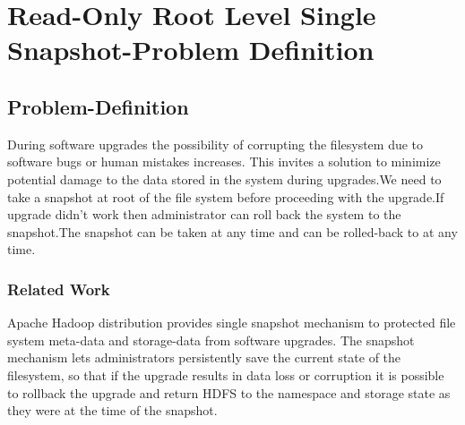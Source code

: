 
%
%
%


\chapter{Read-Only Root Level Single Snapshot-Problem Definition}
\label{ch:RORLSSProblem}






\section{Problem-Definition}
During software upgrades the possibility of corrupting the filesystem due to software bugs or human mistakes increases. This invites a solution to  minimize potential damage to the data stored in the system during upgrades.We need to take a snapshot at root of the file system before proceeding with the upgrade.If upgrade didn't work then administrator can roll back the system to the snapshot.The snapshot can be taken at any time and can be rolled-back to at any time.
\subsection{Related Work}
Apache Hadoop distribution provides single snapshot mechanism to protected file system meta-data and storage-data from software upgrades. The snapshot mechanism lets administrators persistently save the current state of the filesystem, so that if the upgrade results in data loss or corruption it is possible to rollback the upgrade and return HDFS to the namespace and storage state as they were at the time of the snapshot.

